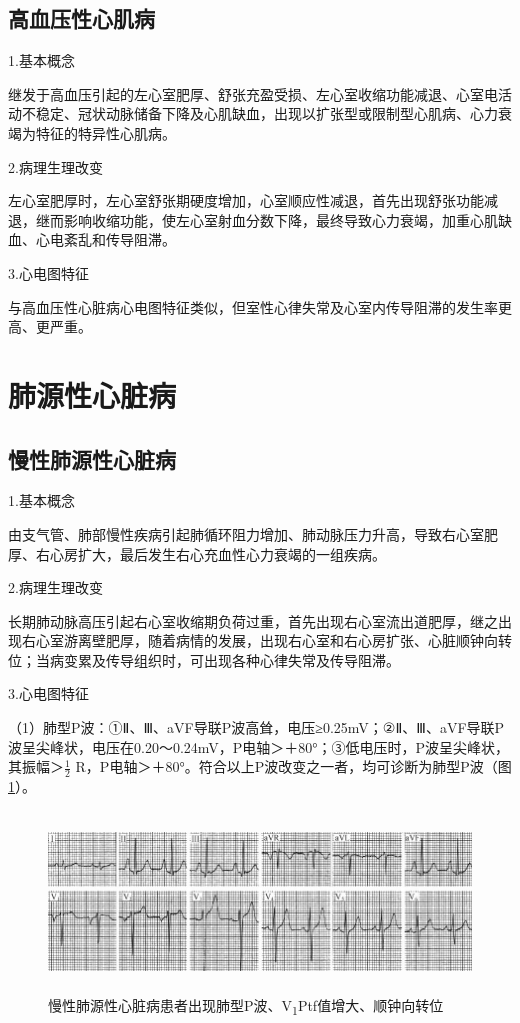 \subsection{高血压性心肌病}

1.基本概念

继发于高血压引起的左心室肥厚、舒张充盈受损、左心室收缩功能减退、心室电活动不稳定、冠状动脉储备下降及心肌缺血，出现以扩张型或限制型心肌病、心力衰竭为特征的特异性心肌病。

2.病理生理改变

左心室肥厚时，左心室舒张期硬度增加，心室顺应性减退，首先出现舒张功能减退，继而影响收缩功能，使左心室射血分数下降，最终导致心力衰竭，加重心肌缺血、心电紊乱和传导阻滞。

3.心电图特征

与高血压性心脏病心电图特征类似，但室性心律失常及心室内传导阻滞的发生率更高、更严重。

\protect\hypertarget{text00050.htmlux5cux23subid596}{}{}

\section{肺源性心脏病}

\protect\hypertarget{text00050.htmlux5cux23subid597}{}{}

\subsection{慢性肺源性心脏病}

1.基本概念

由支气管、肺部慢性疾病引起肺循环阻力增加、肺动脉压力升高，导致右心室肥厚、右心房扩大，最后发生右心充血性心力衰竭的一组疾病。

2.病理生理改变

长期肺动脉高压引起右心室收缩期负荷过重，首先出现右心室流出道肥厚，继之出现右心室游离壁肥厚，随着病情的发展，出现右心室和右心房扩张、心脏顺钟向转位；当病变累及传导组织时，可出现各种心律失常及传导阻滞。

3.心电图特征

（1）肺型P波：①Ⅱ、Ⅲ、aVF导联P波高耸，电压≥0.25mV；②Ⅱ、Ⅲ、aVF导联P波呈尖峰状，电压在0.20～0.24mV，P电轴＞＋80°；③低电压时，P波呈尖峰状，其振幅＞$\frac{1}{2}$
R，P电轴＞＋80°。符合以上P波改变之一者，均可诊断为肺型P波（图\ref{fig42-6}）。

\begin{figure}[!htbp]
 \centering
 \includegraphics[width=5.78125in,height=1.88542in]{./images/Image00697.jpg}
 \captionsetup{justification=centering}
 \caption{慢性肺源性心脏病患者出现肺型P波、V\textsubscript{1}Ptf值增大、顺钟向转位}
 \label{fig42-6}
  \end{figure} 


